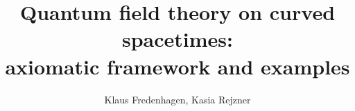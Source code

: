 \documentclass[12pt]{article}
\newcommand{\1}{\mathds{1}}                         %
\begin{document}
\title{Quantum field theory on curved spacetimes:\\ axiomatic framework and examples}
\author{Klaus Fredenhagen, Kasia Rejzner}
\maketitle
 \theoremstyle{plain}
  \newtheorem{df}{Definition}[section]
  \newtheorem{thm}[df]{Theorem}
  \newtheorem{prop}[df]{Proposition}
  \newtheorem{cor}[df]{Corollary}
  \newtheorem{lemma}[df]{Lemma}
    \newtheorem{exa}[df]{Example}
\end{document}
